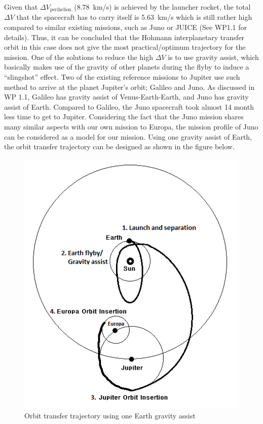 Given that $\Delta V_\mathrm{perihelion}$ (\SI{8.78}{km/s}) is
achieved by the launcher rocket, the total $\Delta V$ that the
spacecraft has to carry itself is \SI{5.63}{km/s} which is still
rather high compared to similar existing missions, such as Juno or
JUICE (See WP1.1 for details).  Thus, it can be concluded that the
Hohmann interplanetary transfer orbit in this case does not give the
most practical/optimum trajectory for the mission.  One of the
solutions to reduce the high $\Delta V$ is to use gravity assist,
which basically makes use of the gravity of other planets during the
flyby to induce a “slingshot” effect.  Two of the existing reference
missions to Jupiter use such method to arrive at the planet Jupiter’s
orbit; Galileo and Juno.  As discussed in WP 1.1, Galileo has gravity
assist of Venus-Earth-Earth, and Juno has gravity assist of Earth.
Compared to Galileo, the Juno spacecraft took almost 14 month less
time to get to Jupiter.\cite{nasagalileo} Considering the fact that
the Juno mission shares many similar aspects with our own mission to
Europa, the mission profile of Juno can be considered as a model for
our mission.  Using one gravity assist of Earth, the orbit transfer
trajectory can be designed as shown in the figure below.

\begin{figure}[H]
  \includegraphics[width=\textwidth]{Transfer-Orbits}
  \caption{Orbit transfer trajectory using one Earth gravity assist}
\end{figure}

